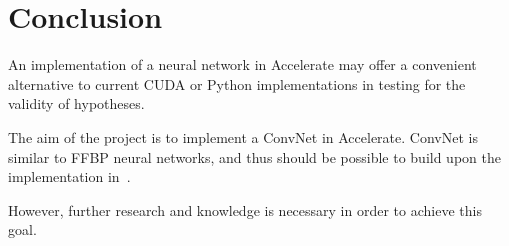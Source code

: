 \chapter{Conclusion}\label{ch:conclusion}

An implementation of a neural network in Accelerate may offer a convenient alternative to current CUDA or Python implementations in testing for the validity of hypotheses. 

The aim of the project is to implement a ConvNet in Accelerate. ConvNet is similar to FFBP neural networks, and thus should be possible to build upon the implementation in~\cite{Eve16}. 

However, further research and knowledge is necessary in order to achieve this goal.